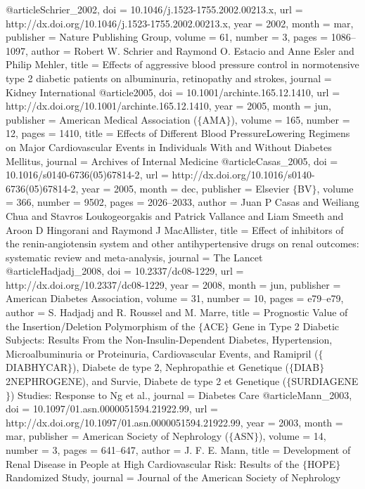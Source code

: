 @article{Schrier_2002,
	doi = {10.1046/j.1523-1755.2002.00213.x},
	url = {http://dx.doi.org/10.1046/j.1523-1755.2002.00213.x},
	year = 2002,
	month = {mar},
	publisher = {Nature Publishing Group},
	volume = {61},
	number = {3},
	pages = {1086--1097},
	author = {Robert W. Schrier and Raymond O. Estacio and Anne Esler and Philip Mehler},
	title = {Effects of aggressive blood pressure control in normotensive type 2 diabetic patients on albuminuria, retinopathy and strokes},
	journal = {Kidney International}
}
@article{2005,
	doi = {10.1001/archinte.165.12.1410},
	url = {http://dx.doi.org/10.1001/archinte.165.12.1410},
	year = 2005,
	month = {jun},
	publisher = {American Medical Association ($\lbrace$AMA$\rbrace$)},
	volume = {165},
	number = {12},
	pages = {1410},
	title = {Effects of Different Blood Pressure{\textendash}Lowering Regimens on Major Cardiovascular Events in Individuals With and Without Diabetes Mellitus},
	journal = {Archives of Internal Medicine}
}
@article{Casas_2005,
	doi = {10.1016/s0140-6736(05)67814-2},
	url = {http://dx.doi.org/10.1016/s0140-6736(05)67814-2},
	year = 2005,
	month = {dec},
	publisher = {Elsevier $\lbrace$BV$\rbrace$},
	volume = {366},
	number = {9502},
	pages = {2026--2033},
	author = {Juan P Casas and Weiliang Chua and Stavros Loukogeorgakis and Patrick Vallance and Liam Smeeth and Aroon D Hingorani and Raymond J MacAllister},
	title = {Effect of inhibitors of the renin-angiotensin system and other antihypertensive drugs on renal outcomes: systematic review and meta-analysis},
	journal = {The Lancet}
}
@article{Hadjadj_2008,
	doi = {10.2337/dc08-1229},
	url = {http://dx.doi.org/10.2337/dc08-1229},
	year = 2008,
	month = {jun},
	publisher = {American Diabetes Association},
	volume = {31},
	number = {10},
	pages = {e79--e79},
	author = {S. Hadjadj and R. Roussel and M. Marre},
	title = {Prognostic Value of the Insertion/Deletion Polymorphism of the $\lbrace$ACE$\rbrace$ Gene in Type 2 Diabetic Subjects: Results From the Non-Insulin-Dependent Diabetes, Hypertension, Microalbuminuria or Proteinuria, Cardiovascular Events, and Ramipril ($\lbrace$DIABHYCAR$\rbrace$), Diabete de type 2, Nephropathie et Genetique ($\lbrace$DIAB$\rbrace$2NEPHROGENE), and Survie, Diabete de type 2 et Genetique ($\lbrace$SURDIAGENE$\rbrace$) Studies: Response to Ng et al.},
	journal = {Diabetes Care}
}
@article{Mann_2003,
	doi = {10.1097/01.asn.0000051594.21922.99},
	url = {http://dx.doi.org/10.1097/01.asn.0000051594.21922.99},
	year = 2003,
	month = {mar},
	publisher = {American Society of Nephrology ($\lbrace$ASN$\rbrace$)},
	volume = {14},
	number = {3},
	pages = {641--647},
	author = {J. F. E. Mann},
	title = {Development of Renal Disease in People at High Cardiovascular Risk: Results of the $\lbrace$HOPE$\rbrace$ Randomized Study},
	journal = {Journal of the American Society of Nephrology}
}
